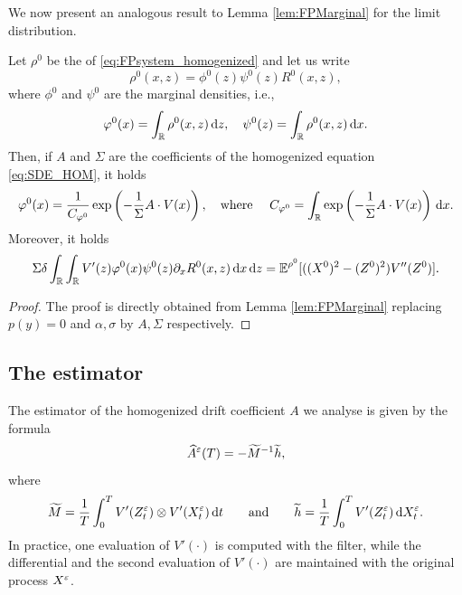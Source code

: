 \documentclass[10pt]{article}
\begin{document}
We now present an analogous result to Lemma \ref{lem:FPMarginal} for the limit distribution.

\begin{corollary}\label{lem:FPMarginal_Hom} Let $\rho^0$ be the  of \eqref{eq:FPsystem_homogenized} and let us write 
	\begin{equation}
		\rho^0(x, z) = \phi^0(z)\psi^0(z)R^0(x,z),
	\end{equation}
	where $\phi^0$ and $\psi^0$ are the marginal densities, i.e., 
	\begin{equation}
		\varphi^0(x) = \int_{\mathbb{R}} \rho^0(x,z) \,\mathrm{d} z, \quad \psi^0(z) = \int_{\mathbb{R}} \rho^0(x,z) \,\mathrm{d} x.
	\end{equation}
	Then, if $A$ and $\Sigma$ are the coefficients of the homogenized equation \eqref{eq:SDE_HOM}, it holds
	\begin{equation}
		\varphi^0(x) = \frac{1}{C_{\varphi^0}} \exp\left(- \frac1{\Sigma} A\cdot V(x)\right), \quad \text{where } \quad C_{\varphi^0} = \int_{\mathbb{R}} \exp\left(- \frac1{\Sigma} A\cdot V(x) \right) \,\mathrm{d} x.
	\end{equation}
	Moreover, it holds
	\begin{equation}
		\Sigma \delta \int_{\mathbb{R}} \int_{\mathbb{R}} V'(z) \varphi^0(x) \psi^0(z) \partial_x R^0(x,z) \,\mathrm{d} x \,\mathrm{d} z = \operatorname{\mathbb{E}}^{\rho^0}[((X^0)^2 - (Z^0)^2)V''(Z^0)].
	\end{equation}
\end{corollary}
\begin{proof} The proof is directly obtained from Lemma \ref{lem:FPMarginal} replacing $p(y)=0$ and $\alpha, \sigma$ by $A, \Sigma$ respectively. 
\end{proof}

\subsection{The estimator}

The estimator of the homogenized drift coefficient $A$ we analyse is given by the formula
\begin{equation}\label{eq:AHatMixed}
	\widehat A^\varepsilon(T) = - \widetilde M^{-1} \widetilde h,
\end{equation}
where
\begin{equation}\label{eq:MandHTilde}
	\widetilde M = \frac{1}{T} \int_0^T V'(Z^\varepsilon_t) \otimes V'(X^\varepsilon_t) \,\mathrm{d} t \qquad \text{and} \qquad \widetilde h = \frac{1}{T} \int_0^T V'(Z^\varepsilon_t) \,\mathrm{d} X^\varepsilon_t.
\end{equation}
In practice, one evaluation of $V'(\cdot)$ is computed with the filter, while the differential and the second evaluation of $V'(\cdot)$ are maintained with the original process $X^\varepsilon$. 
\end{document}
